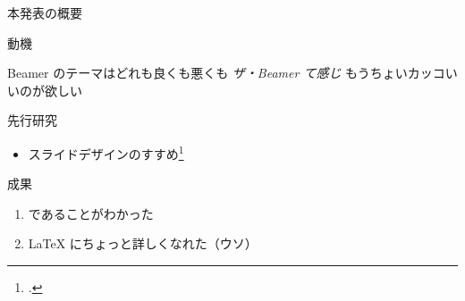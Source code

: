 \begin{frame}{本発表の概要}

  \begin{block}{動機}
    \begin{itemize}
      \ngitem Beamer のテーマはどれも良くも悪くも \emph{ザ・Beamer て感じ}
      \thusitem もうちょいカッコいいのが欲しい
    \end{itemize}
  \end{block}
  
 \begin{block}{先行研究}
   \begin{itemize}
   \item
     スライドデザインのすすめ\footcite{slidedesign}
   \end{itemize}
 \end{block}
  
 \begin{block}{成果}
  \begin{enumerate}
  \item {} であることがわかった
  \item \LaTeX{} にちょっと詳しくなれた（ウソ）
  \end{enumerate}
 \end{block}
  
\end{frame}
